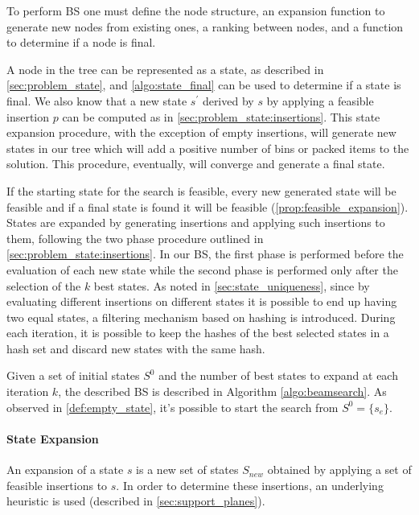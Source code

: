 To perform BS one must define the node structure, an expansion function to generate new nodes from existing ones, a ranking between nodes, and a function to determine if a node is final.

A node in the tree can be represented as a state, as described in  \cref{sec:problem_state}, and \cref{algo:state_final} can be used to determine if a state is final. We also know that a new state $s^\prime$ derived by $s$ by applying a feasible insertion $p$ can be computed as in \cref{sec:problem_state:insertions}.
This state expansion procedure, with the exception of empty insertions, will generate new states in our tree which will add a positive number of bins or packed items to the solution. This procedure, eventually, will converge and generate a final state.

If the starting state for the search is feasible, every new generated state will be feasible and if a final state is found it will be feasible (\cref{prop:feasible_expansion}).
States are expanded by generating insertions and applying such insertions to them, following the two phase procedure outlined in \cref{sec:problem_state:insertions}. In our BS, the first phase is performed before the evaluation of each new state while the second phase is performed only after the selection of the $k$ best states.
As noted in \cref{sec:state_uniqueness}, since by evaluating different insertions on different states it is possible to end up having two equal states, a filtering mechanism based on hashing is introduced.
During each iteration, it is possible to keep the hashes of the best selected states in a hash set and discard new states with the same hash.

Given a set of initial states $S^0$ and the number of best states to expand at each iteration $k$, the described BS is described in Algorithm \ref{algo:beamsearch}.
As observed in \cref{def:empty_state}, it's possible to start the search from $S^0 = \{ s_e \}$.



\paragraph*{State Expansion}

An expansion of a state $s$ is a new set of states $S_{new}$ obtained by applying a set of feasible insertions to $s$. In order to determine these insertions, an underlying heuristic is used (described in \cref{sec:support_planes}).

